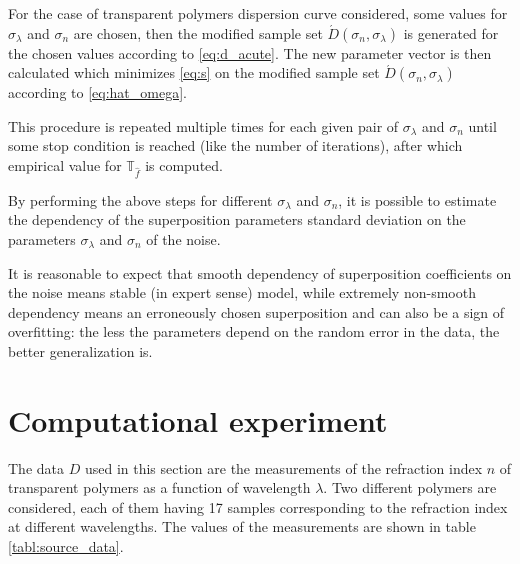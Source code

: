 \documentclass[11pt,a4paper]{article}
\theoremstyle{definition}
\begin{document}
For the case of transparent polymers dispersion curve considered,
some values for $\sigma_{\lambda}$ and $\sigma_n$ are chosen,
then the modified sample set $\acute{D}(\sigma_n, \sigma_{\lambda})$ is
generated for the chosen values according to \eqref{eq:d_acute}. The new
parameter vector is then calculated which minimizes \eqref{eq:s} on the
modified sample set $\acute{D}(\sigma_n, \sigma_{\lambda})$ according to
\eqref{eq:hat_omega}.

This procedure is repeated multiple times for each given pair of $\sigma_{\lambda}$ and $\sigma_n$
until some stop condition is reached (like the number of iterations), after which
empirical value for $\mathbb{T}_{\hat{f}}$ is computed.

By performing the above steps for different $\sigma_{\lambda}$ and $\sigma_n$,
it is possible to estimate the dependency of the superposition parameters
standard deviation on the parameters $\sigma_{\lambda}$ and $\sigma_n$ of the noise.

It is reasonable to expect that smooth dependency of superposition coefficients
on the noise means stable (in expert sense) model, while extremely
non-smooth dependency means an erroneously chosen superposition and can also be
a sign of overfitting: the less the parameters depend on the random error
in the data, the better generalization is.

\section{Computational experiment}

The data $D$ used in this section are the measurements of the refraction index $n$
of transparent polymers as a function of wavelength $\lambda$. Two different polymers
are considered, each of them having 17 samples corresponding to the
refraction index at different wavelengths. The values of the measurements
are shown in table \ref{tabl:source_data}.
\end{document}
